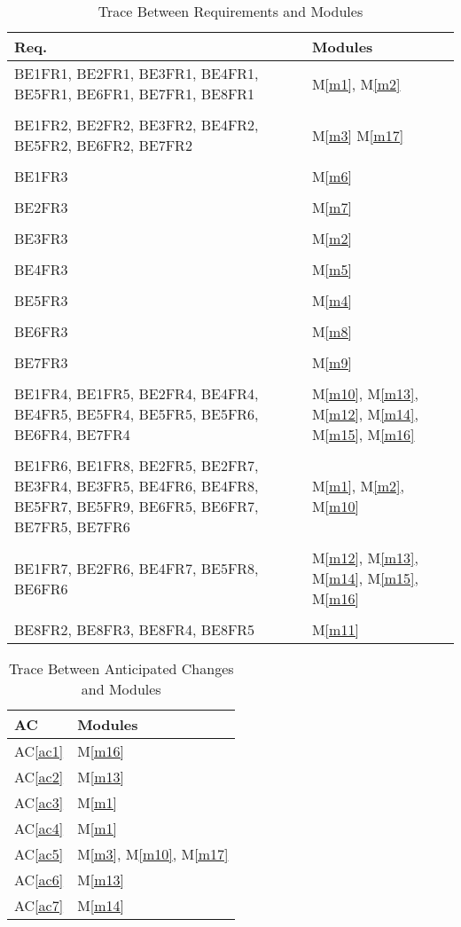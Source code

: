 \documentclass[12pt, titlepage]{article}
\newcommand{\acref}[1]{AC\ref{#1}}
\newcommand{\mref}[1]{M\ref{#1}}
\begin{document}
\begin{table}[H]
\centering
\begin{tabular}{p{} p{}}
\toprule
\textbf{Req.} & \textbf{Modules}\\
\midrule
BE1FR1, BE2FR1, BE3FR1, BE4FR1, BE5FR1, BE6FR1, BE7FR1, BE8FR1 & \mref{m1}, \mref{m2}\\\\
BE1FR2, BE2FR2, BE3FR2, BE4FR2, BE5FR2, BE6FR2, BE7FR2 & \mref{m3} {\color{red}\mref{m17}}\\\\
BE1FR3 & \mref{m6}\\\\
BE2FR3 & \mref{m7}\\\\
BE3FR3 & \mref{m2}\\\\
BE4FR3 & \mref{m5}\\\\
BE5FR3 & \mref{m4}\\\\
BE6FR3 & \mref{m8}\\\\
BE7FR3 & \mref{m9}\\\\
BE1FR4, BE1FR5, BE2FR4, BE4FR4, BE4FR5, BE5FR4, BE5FR5, BE5FR6, BE6FR4, BE7FR4 & \mref{m10}, \mref{m13}, \mref{m12}, \mref{m14}, \mref{m15}, \mref{m16}\\\\
BE1FR6, BE1FR8, BE2FR5, BE2FR7, BE3FR4, BE3FR5, BE4FR6, BE4FR8, BE5FR7, BE5FR9, BE6FR5, BE6FR7, BE7FR5, BE7FR6 & \mref{m1}, \mref{m2}, \mref{m10}\\\\
BE1FR7, BE2FR6, BE4FR7, BE5FR8, BE6FR6 & \mref{m12}, \mref{m13}, \mref{m14}, \mref{m15}, \mref{m16}\\\\
BE8FR2, BE8FR3, BE8FR4, BE8FR5 & \mref{m11}\\
\bottomrule
\end{tabular}
\caption{Trace Between Requirements and Modules}
\label{TblRT}
\end{table}

\begin{table}[H]
\centering
\begin{tabular}{p{} p{}}
\toprule
\textbf{AC} & \textbf{Modules}\\
\midrule
\acref{ac1} & \mref{m16}\\
\acref{ac2} & \mref{m13}\\
\acref{ac3} & \mref{m1}\\
\acref{ac4} & \mref{m1}\\
\acref{ac5} & \mref{m3}, \mref{m10}, {\color{red}\mref{m17}}\\
\acref{ac6} & \mref{m13}\\
\acref{ac7} & \mref{m14}\\
\bottomrule
\end{tabular}
\caption{Trace Between Anticipated Changes and Modules}
\label{TblACT}
\end{table}
\end{document}
